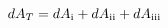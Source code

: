 \documentclass{standalone}
\newcommand{\RN}[1]{%
  \textup{\uppercase\expandafter{\romannumeral#1}}%
}
\begin{document}
    $dA_T = dA_\RN{1} + dA_\RN{2} + dA_\RN{3}$
\end{document}
